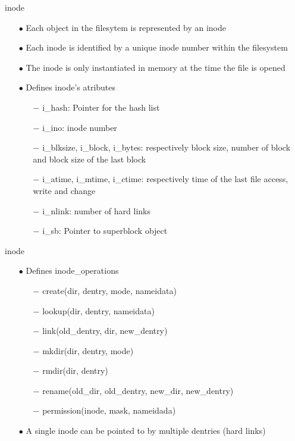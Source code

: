 \documentclass{beamer}
\begin{document}
\begin{frame}{inode}
	
	\begin{itemize}[<+->]

		\item[$\bullet$]{Each object in the filesytem is represented by an inode}
		\item[$\bullet$]{Each inode is identified by a unique inode number within the filesystem}		
		\item[$\bullet$]{The inode is only instantiated in memory at the time the file is opened}
		
		\item[$\bullet$]{Defines inode's atributes}
			\begin{itemize}
				\item[$-$]{i\_hash: Pointer for the hash list}
				\item[$-$]{i\_ino: inode number}
				\item[$-$]{i\_blksize, i\_block, i\_bytes: respectively block size, number of block and block size of the last block}
				\item[$-$]{i\_atime, i\_mtime, i\_ctime: respectively time of the last file access, write and change}
				\item[$-$]{i\_nlink: number of hard links}
				\item[$-$]{i\_sb: Pointer to superblock object}
			\end{itemize}
	\end{itemize}

\end{frame}

\begin{frame}{inode}
	\begin{itemize}[<+->]
		\item[$\bullet$]{Defines inode\_operations}
			\begin{itemize}
				\item[$-$]{create(dir, dentry, mode, nameidata)}
				\item[$-$]{lookup(dir, dentry, nameidata)}
				\item[$-$]{link(old\_dentry, dir, new\_dentry)}
				\item[$-$]{mkdir(dir, dentry, mode)}
				\item[$-$]{rmdir(dir, dentry)}
				\item[$-$]{rename(old\_dir, old\_dentry, new\_dir, new\_dentry)}	
				\item[$-$]{permission(inode, mask, nameidada)}
			\end{itemize}

		\item[$\bullet$]{A single inode can be pointed to by multiple dentries (hard links)}
	\end{itemize}
\end{frame}
\end{document}
